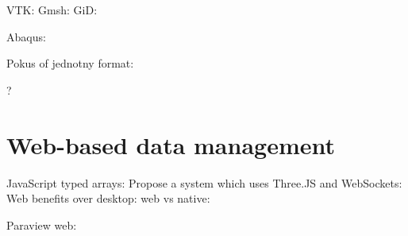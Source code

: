 

VTK: \cite{VTK2015}
Gmsh: \cite{Geuzaine2009}
GiD: \cite{GiDPostProcess}

Abaqus: \cite{Abaqus}

\cite{OpenCTM2010}

Pokus of jednotny format: \cite{Ivanyi2012}

? \cite{OpenCASCADE}



\section{Web-based data management}

JavaScript typed arrays: \cite{Behr2012}
Propose a system which uses Three.JS and WebSockets: \cite{Marion2012}
Web benefits over desktop: \cite{Mouton2011}
web vs native: \cite{Charland2011}

\cite{Ari2013}
\cite{Yu2010}
\cite{Peng2003}
\cite{Heber2007I}
\cite{Heber2007II}
\cite{Weng2011}
\cite{Chen2008}

Paraview web: \cite{Jourdain2011}

\cite{SimScale}
